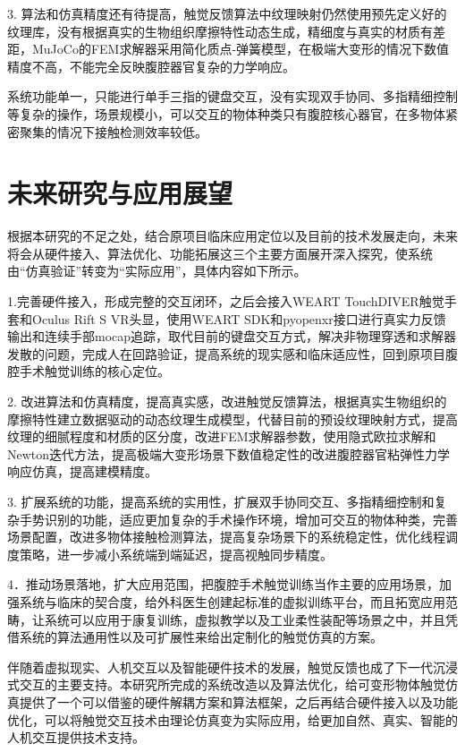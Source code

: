 3.
算法和仿真精度还有待提高，触觉反馈算法中纹理映射仍然使用预先定义好的纹理库，没有根据真实的生物组织摩擦特性动态生成，精细度与真实的材质有差距，MuJoCo的FEM求解器采用简化质点-弹簧模型，在极端大变形的情况下数值精度不高，不能完全反映腹腔器官复杂的力学响应。

系统功能单一，只能进行单手三指的键盘交互，没有实现双手协同、多指精细控制等复杂的操作，场景规模小，可以交互的物体种类只有腹腔核心器官，在多物体紧密聚集的情况下接触检测效率较低。

\section{未来研究与应用展望}

根据本研究的不足之处，结合原项目临床应用定位以及目前的技术发展走向，未来将会从硬件接入、算法优化、功能拓展这三个主要方面展开深入探究，使系统由``仿真验证''转变为``实际应用''，具体内容如下所示。

1.完善硬件接入，形成完整的交互闭环，之后会接入WEART
TouchDIVER触觉手套和Oculus Rift S VR头显，使用WEART
SDK和pyopenxr接口进行真实力反馈输出和连续手部mocap追踪，取代目前的键盘交互方式，解决非物理穿透和求解器发散的问题，完成人在回路验证，提高系统的现实感和临床适应性，回到原项目腹腔手术触觉训练的核心定位。

2.
改进算法和仿真精度，提高真实感，改进触觉反馈算法，根据真实生物组织的摩擦特性建立数据驱动的动态纹理生成模型，代替目前的预设纹理映射方式，提高纹理的细腻程度和材质的区分度，改进FEM求解器参数，使用隐式欧拉求解和Newton迭代方法，提高极端大变形场景下数值稳定性的改进腹腔器官粘弹性力学响应仿真，提高建模精度。

3.
扩展系统的功能，提高系统的实用性，扩展双手协同交互、多指精细控制和复杂手势识别的功能，适应更加复杂的手术操作环境，增加可交互的物体种类，完善场景配置，改进多物体接触检测算法，提高复杂场景下的系统稳定性，优化线程调度策略，进一步减小系统端到端延迟，提高视触同步精度。

4．推动场景落地，扩大应用范围，把腹腔手术触觉训练当作主要的应用场景，加强系统与临床的契合度，给外科医生创建起标准的虚拟训练平台，而且拓宽应用范畴，让系统可以应用于康复训练，虚拟教学以及工业柔性装配等场景之中，并且凭借系统的算法通用性以及可扩展性来给出定制化的触觉仿真的方案。

伴随着虚拟现实、人机交互以及智能硬件技术的发展，触觉反馈也成了下一代沉浸式交互的主要支持。本研究所完成的系统改造以及算法优化，给可变形物体触觉仿真提供了一个可以借鉴的硬件解耦方案和算法框架，之后再结合硬件接入以及功能优化，可以将触觉交互技术由理论仿真变为实际应用，给更加自然、真实、智能的人机交互提供技术支持。
